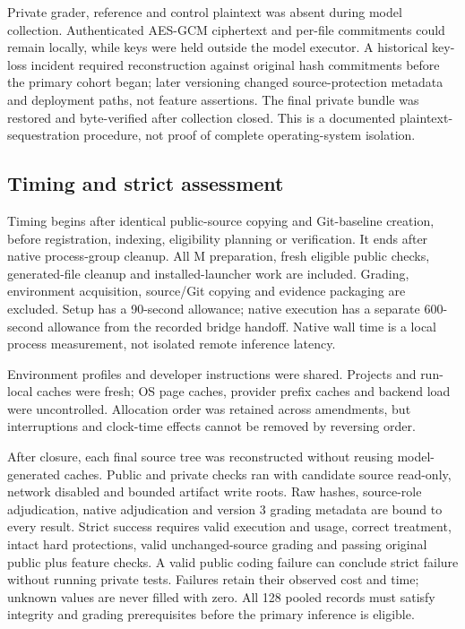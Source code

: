 \documentclass[manuscript,screen,nonacm]{acmart}
\begin{document}
Private grader, reference and control plaintext was absent during model
collection. Authenticated AES-GCM ciphertext and per-file commitments
could remain locally, while keys were held outside the model executor. A
historical key-loss incident required reconstruction against original
hash commitments before the primary cohort began; later versioning
changed source-protection metadata and deployment paths, not feature
assertions. The final private bundle was restored and byte-verified
after collection closed. This is a documented plaintext-sequestration
procedure, not proof of complete operating-system isolation.

\subsection{Timing and strict
assessment}\label{timing-and-strict-assessment}

Timing begins after identical public-source copying and Git-baseline
creation, before registration, indexing, eligibility planning or
verification. It ends after native process-group cleanup. All M
preparation, fresh eligible public checks, generated-file cleanup and
installed-launcher work are included. Grading, environment acquisition,
source/Git copying and evidence packaging are excluded. Setup has a
90-second allowance; native execution has a separate 600-second
allowance from the recorded bridge handoff. Native wall time is a local
process measurement, not isolated remote inference latency.

Environment profiles and developer instructions were shared. Projects
and run-local caches were fresh; OS page caches, provider prefix caches
and backend load were uncontrolled. Allocation order was retained across
amendments, but interruptions and clock-time effects cannot be removed
by reversing order.

After closure, each final source tree was reconstructed without reusing
model-generated caches. Public and private checks ran with candidate
source read-only, network disabled and bounded artifact write roots. Raw
hashes, source-role adjudication, native adjudication and version 3
grading metadata are bound to every result. Strict success requires
valid execution and usage, correct treatment, intact hard protections,
valid unchanged-source grading and passing original public plus feature
checks. A valid public coding failure can conclude strict failure
without running private tests. Failures retain their observed cost and
time; unknown values are never filled with zero. All 128 pooled records
must satisfy integrity and grading prerequisites before the primary
inference is eligible.
\end{document}
